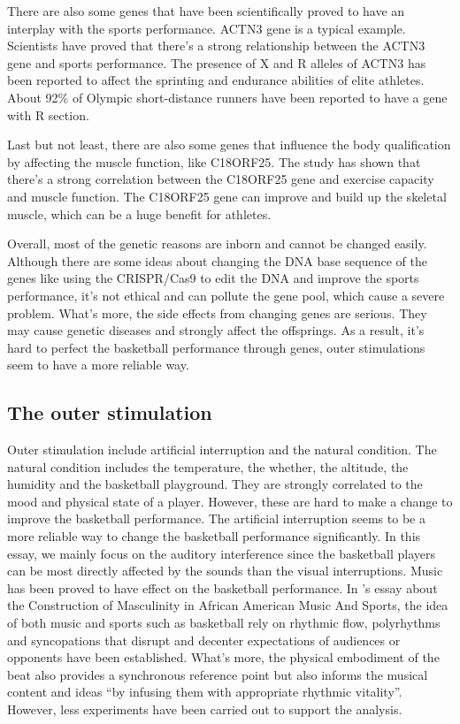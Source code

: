\documentclass{article}
\begin{document}
There are also some genes that have been scientifically proved to have an interplay with the sports performance. ACTN3 gene is a typical example. Scientists have proved that there's a strong relationship between the ACTN3 gene and sports performance. The presence of X and R alleles of ACTN3 has been reported to affect the sprinting and endurance abilities of elite athletes. About 92\% of Olympic short-distance runners have been reported to have a gene with R section.\autocite{goelACTN3AthleteGene2007}

Last but not least, there are also some genes that influence the body qualification by affecting the muscle function, like C18ORF25. The study has shown that there's a strong correlation between the C18ORF25 gene and exercise capacity and muscle function. The C18ORF25 gene can improve and build up the skeletal muscle, which can be a huge benefit for athletes.\autocite{blazevPhosphoproteomicsThreeExercise2022}

Overall, most of the genetic reasons are inborn and cannot be changed easily. Although there are some ideas about changing the DNA base sequence of the genes like using the CRISPR/Cas9 to edit the DNA and improve the sports performance, it's not ethical and can pollute the gene pool, which cause a severe problem. What's more, the side effects from changing genes are serious. They may cause genetic diseases and strongly affect the offsprings. As a result, it's hard to perfect the basketball performance through genes, outer stimulations seem to have a more reliable way. 

\subsection{The outer stimulation}
Outer stimulation include artificial interruption and the natural condition. The natural condition includes the temperature, the whether, the altitude, the humidity and the basketball playground. They are strongly correlated to the mood and physical state of a player. However, these are hard to make a change to improve the basketball performance. The artificial interruption seems to be a more reliable way to change the basketball performance significantly. In this essay, we mainly focus on the auditory interference since the basketball players can be most directly affected by the sounds than the visual interruptions. \todo{()} Music has been proved to have effect on the basketball performance. In \textcite{mcleodConstructionMasculinityAfrican2009}'s essay about the Construction of Masculinity in African American Music And Sports, the idea of both music and sports such as basketball rely on rhythmic flow, polyrhythms and syncopations that disrupt and decenter expectations of audiences or opponents have been established. What's more, the physical embodiment of the beat also provides a synchronous reference point but also informs the musical content and ideas ``by infusing them with appropriate rhythmic vitality''. However, less experiments have been carried out to support the analysis. 
\end{document}
